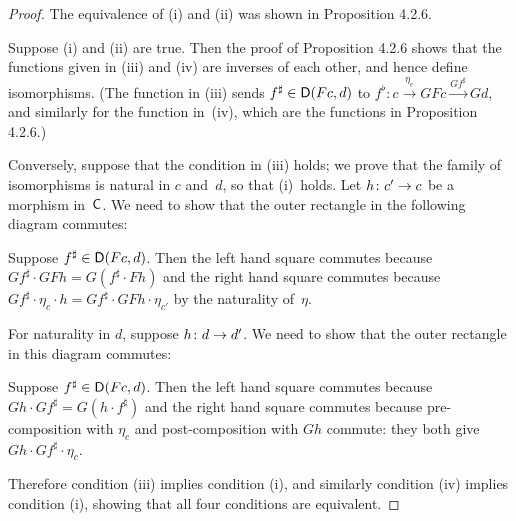 \documentclass[../../solutions]{subfiles}
\begin{document}
\begin{proof}[Proof]
  The equivalence of (i) and (ii) was shown in Proposition 4.2.6.

  Suppose (i) and (ii) are true.  Then the proof of Proposition 4.2.6
  shows that the functions given in (iii) and (iv) are inverses of
  each other, and hence define isomorphisms.  (The function in (iii)
  sends $f^\sharp\in{\mathsf{D}}(Fc,d)$  to $f^\flat\colon
  c\xrightarrow{\eta_c} GFc\xrightarrow{Gf^\sharp} Gd$, and similarly
  for the function in~(iv), which are the functions in Proposition
  4.2.6.)

  Conversely, suppose that the condition in (iii) holds; we prove that
  the family of isomorphisms is natural in $c$ and~$d$, so that
  (i)~holds.  Let ${h}\colon{c'}\to{c}$ be a morphism in~${\mathsf{C}}$.  We need
  to show that the outer rectangle in the following diagram commutes:
  \begin{center}
  \end{center}
  Suppose $f^\sharp\in{\mathsf{D}}(Fc,d)$.  Then the left hand square commutes
  because $Gf^\sharp\cdot GFh=G(f^\sharp\cdot Fh)$ and the right hand
  square commutes because $Gf^\sharp\cdot \eta_c\cdot h=Gf^\sharp
  \cdot GFh\cdot \eta_{c'}$ by the naturality of~$\eta$.

  For naturality in $d$, suppose ${h}\colon{d}\to{d'}$.  We need to show
  that the outer rectangle in this diagram commutes:
  \begin{center}
  \end{center}
  Suppose $f^\sharp\in{\mathsf{D}}(Fc,d)$.  Then the left hand square commutes
  because $Gh\cdot Gf^\sharp=G(h\cdot f^\sharp)$ and the right hand
  square commutes because pre-composition with $\eta_c$ and
  post-composition with $Gh$ commute: they both give $Gh\cdot
  Gf^\sharp\cdot \eta_c$.

  Therefore condition (iii) implies condition (i), and similarly
  condition (iv) implies condition (i), showing that all four
  conditions are equivalent.
\end{proof}
\end{document}
